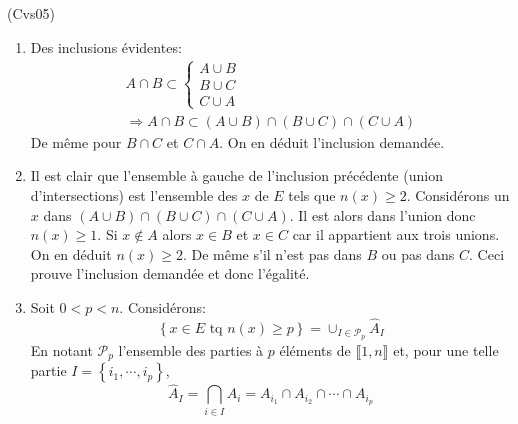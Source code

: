 \begin{tiny}(Cvs05)\end{tiny}
\begin{enumerate}
  \item Des inclusions évidentes:
\begin{multline*}
  A\cap B \subset
  \left\lbrace 
  \begin{aligned}
    A \cup B \\ B\cup C \\ C \cup A
  \end{aligned}
  \right. \\
  \Rightarrow
A\cap B \subset  (A \cup B) \cap (B\cup C) \cap (C \cup A) 
\end{multline*}
De même pour $B\cap C$ et $C\cap A$. On en déduit l'inclusion demandée.

  \item Il est clair que l'ensemble à gauche de l'inclusion précédente (union d'intersections) est l'ensemble des $x$ de $E$ tels que $n(x)\geq 2$.\newline
  Considérons un $x$ dans $(A\cup B)\cap (B\cup C) \cap (C\cup A)$. Il est alors dans l'union donc $n(x)\geq 1$. Si $x\notin A$ alors $x\in B$ et $x\in C$ car il appartient aux trois unions. On en déduit $n(x)\geq 2$. De même s'il n'est pas dans $B$ ou pas dans $C$. Ceci prouve l'inclusion demandée et donc l'égalité.
  
  \item Soit $0< p <n$. Considérons:
 \begin{displaymath}
   \left\lbrace x\in E \text{ tq } n(x)\geq p\right\rbrace
= \cup_{I\in \mathcal{P}_p}\hat{A}_I
 \end{displaymath}
En notant $\mathcal{P}_p$ l'ensemble des parties à $p$ éléments de $\llbracket 1, n\rrbracket$ et, pour une telle partie $I=\left\lbrace i_1,\cdots, i_p \right\rbrace$,
\begin{displaymath}
  \hat{A}_I = \bigcap_{i\in I}A_i = A_{i_1}\cap A_{i_2}\cap \cdots \cap A_{i_p} 
\end{displaymath}

\end{enumerate}
